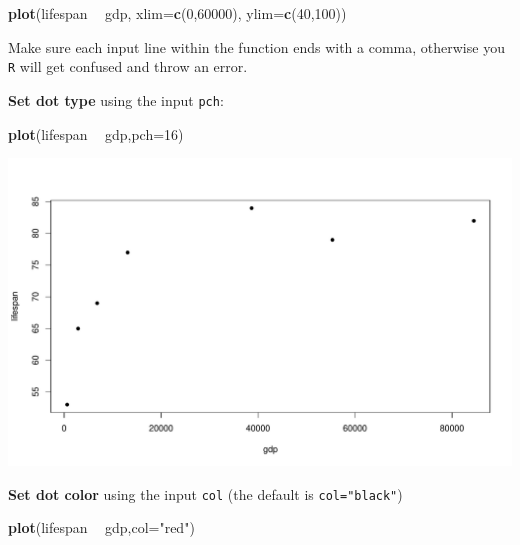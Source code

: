 \documentclass[
]{book}
\newenvironment{Shaded}{\begin{snugshade}}{\end{snugshade}}
\newcommand{\DataTypeTok}[1]{\textcolor[rgb]{0.13,0.29,0.53}{#1}}
\newcommand{\DecValTok}[1]{\textcolor[rgb]{0.00,0.00,0.81}{#1}}
\newcommand{\KeywordTok}[1]{\textcolor[rgb]{0.13,0.29,0.53}{\textbf{#1}}}
\newcommand{\NormalTok}[1]{#1}
\newcommand{\OperatorTok}[1]{\textcolor[rgb]{0.81,0.36,0.00}{\textbf{#1}}}
\newcommand{\StringTok}[1]{\textcolor[rgb]{0.31,0.60,0.02}{#1}}
\begin{document}
\begin{Shaded}
\begin{Highlighting}[]
\KeywordTok{plot}\NormalTok{(lifespan }\OperatorTok{~}\StringTok{ }\NormalTok{gdp,}
     \DataTypeTok{xlim=}\KeywordTok{c}\NormalTok{(}\DecValTok{0}\NormalTok{,}\DecValTok{60000}\NormalTok{),}
     \DataTypeTok{ylim=}\KeywordTok{c}\NormalTok{(}\DecValTok{40}\NormalTok{,}\DecValTok{100}\NormalTok{))}
\end{Highlighting}
\end{Shaded}

Make sure each input line within the function ends with a comma, otherwise you \texttt{R} will get confused and throw an error.

\textbf{Set dot type} using the input \texttt{pch}:

\begin{Shaded}
\begin{Highlighting}[]
\KeywordTok{plot}\NormalTok{(lifespan }\OperatorTok{~}\StringTok{ }\NormalTok{gdp,}\DataTypeTok{pch=}\DecValTok{16}\NormalTok{)}
\end{Highlighting}
\end{Shaded}

\includegraphics{figures/unnamed-chunk-106-1.pdf}

\textbf{Set dot color} using the input \texttt{col} (the default is \texttt{col="black"})

\begin{Shaded}
\begin{Highlighting}[]
\KeywordTok{plot}\NormalTok{(lifespan }\OperatorTok{~}\StringTok{ }\NormalTok{gdp,}\DataTypeTok{col=}\StringTok{"red"}\NormalTok{)}
\end{Highlighting}
\end{Shaded}
\end{document}

